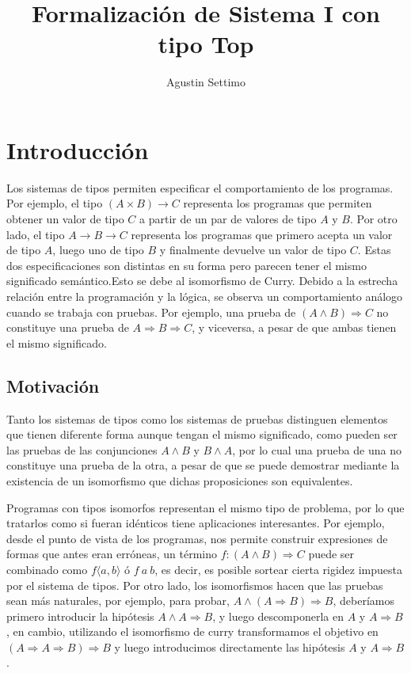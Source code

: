 \documentclass[]{report}
\title{Formalización de Sistema I con tipo Top}
\author{Agustin Settimo}
\begin{document}
	
	\maketitle
	\tableofcontents
	
	\begin{abstract}
		
	\end{abstract}
	
	\chapter{Introducción}
	Los sistemas de tipos permiten especificar el comportamiento de los programas.
	Por ejemplo, el tipo $(A \times B) \rightarrow C$ representa los programas que permiten obtener un valor de tipo $C$ a partir de un par de valores de tipo $A$ y $B$. Por otro lado, el tipo $A \rightarrow B \rightarrow C$ representa los programas que primero acepta un valor de tipo $A$, luego uno de tipo $B$ y finalmente devuelve un valor de tipo $C$.
	Estas dos especificaciones son distintas en su forma pero parecen tener el mismo significado semántico.Esto se debe
	al isomorfismo de Curry.
	Debido a la estrecha relación entre la programación y la lógica, se observa un comportamiento análogo cuando se trabaja con pruebas.
	Por ejemplo, una prueba de $(A \wedge B) \Rightarrow C$ no constituye una prueba de $A \Rightarrow B \Rightarrow C$, y viceversa, a pesar de que ambas tienen el mismo significado.
	
	\section{Motivación}
	
	Tanto los sistemas de tipos como los sistemas de pruebas distinguen elementos que tienen diferente forma aunque tengan el mismo significado, como pueden ser las pruebas de las conjunciones $A \wedge B$ y $B \wedge A$, por lo cual una prueba de una no constituye una prueba de la otra, a pesar de que se puede demostrar mediante la existencia de un isomorfismo que dichas proposiciones son equivalentes.
	
	Programas con tipos isomorfos representan el mismo tipo de problema, por lo que tratarlos como si fueran idénticos tiene aplicaciones interesantes.
	Por ejemplo, desde el punto de vista de los programas, nos permite construir expresiones de formas que antes eran erróneas, un término $f : (A \wedge B) \Rightarrow C$ puede ser combinado como $f \langle a, b \rangle$ ó $f \: a \: b$, es decir, es posible sortear cierta rigidez impuesta por el sistema de tipos.
	Por otro lado, los isomorfismos hacen que las pruebas sean más naturales, por ejemplo, para probar, $A \wedge (A \Rightarrow  B) \Rightarrow B$, deberíamos primero introducir la hipótesis $A \wedge A \Rightarrow  B$, y luego descomponerla en $A$ y $A \Rightarrow B$, en cambio, utilizando el isomorfismo de curry transformamos el objetivo en $(A \Rightarrow A \Rightarrow  B) \Rightarrow B$ y luego introducimos directamente las hipótesis $A$ y $A \Rightarrow B$.
	
\end{document}
